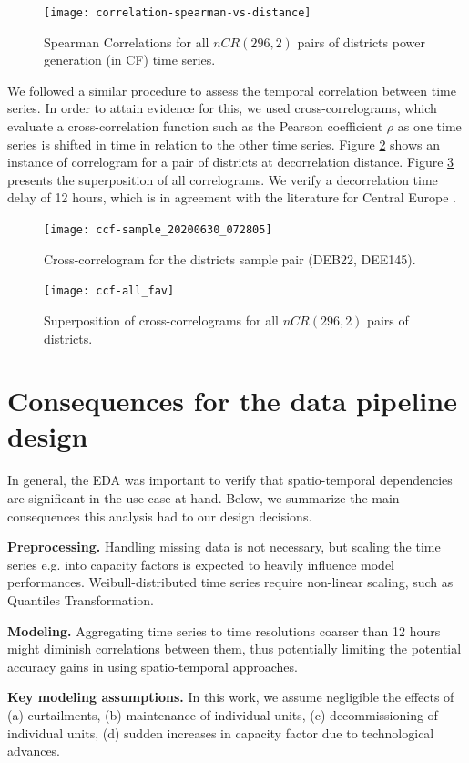 \begin{figure}[H]%
	\centering
    \caption{Spearman Correlations for all $nCR(296, 2)$ pairs of districts power generation (in CF) time series.}
    \texttt{[image: correlation-spearman-vs-distance]}
	\label{fig:correlogram}
\end{figure}

We followed a similar procedure to assess the temporal correlation between time series.
In order to attain evidence for this, we used cross-correlograms, which evaluate a cross-correlation function such as the Pearson coefficient $\rho$ as one time series is shifted in time in relation to the other time series.
Figure \ref{fig:ccf} shows an instance of correlogram for a pair of districts at decorrelation distance.
Figure \ref{fig:ccf_all} presents the superposition of all correlograms.
We verify a decorrelation time delay of 12 hours, which is in agreement with the literature for Central Europe \cite{engeland2017variability}.

\begin{figure}[H]%
	\centering
    \caption{Cross-correlogram for the districts sample pair (DEB22, DEE145).}
    \texttt{[image: ccf-sample\_20200630\_072805]}
	\label{fig:ccf}
\end{figure}

\begin{figure}[H]%
	\centering
    \caption{Superposition of cross-correlograms for all $nCR(296, 2)$ pairs of districts.}
    \texttt{[image: ccf-all\_fav]}
	\label{fig:ccf_all}
\end{figure}


\section{Consequences for the data pipeline design}\label{sec:eda_conclusions}

In general, the EDA was important to verify that spatio-temporal dependencies are significant in the use case at hand.
Below, we summarize the main consequences this analysis had to our design decisions.

\vspace{1em}
\noindent
\textbf{Preprocessing.} Handling missing data is not necessary, but scaling the time series e.g. into capacity factors is expected to heavily influence model performances.
Weibull-distributed time series require non-linear scaling, such as Quantiles Transformation.

\vspace{1em}
\noindent
\textbf{Modeling.} Aggregating time series to time resolutions coarser than 12 hours might diminish correlations between them, thus potentially limiting the potential accuracy gains in using spatio-temporal approaches.

\vspace{1em}
\noindent
\textbf{Key modeling assumptions.} In this work, we assume negligible the effects of (a) curtailments, (b) maintenance of individual units, (c) decommissioning of individual units, (d) sudden increases in capacity factor due to technological advances.
